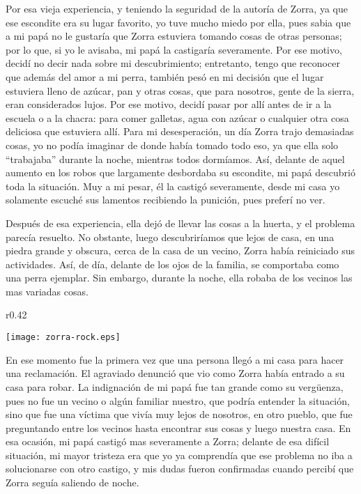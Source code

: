 Por esa vieja experiencia, y teniendo la seguridad de la autoría de Zorra, ya que ese escondite era su lugar favorito, yo tuve mucho miedo por ella, pues sabia que a mi papá no le gustaría que Zorra estuviera tomando cosas de otras personas; por lo que, si yo le avisaba, mi papá la castigaría severamente. Por ese motivo, decidí no decir nada sobre mi descubrimiento; entretanto, tengo que reconocer que además del amor a mi perra, también pesó en mi decisión que el lugar estuviera lleno de azúcar, pan y otras cosas, que para nosotros, gente de la sierra, eran considerados lujos.
Por ese motivo, decidí pasar por allí antes de ir a la escuela o a la chacra: para comer galletas, agua con azúcar o cualquier otra cosa deliciosa que estuviera allí.
Para mi desesperación, un día Zorra trajo demasiadas cosas, yo no podía imaginar de donde había tomado todo eso, ya que ella solo ``trabajaba'' durante la noche, mientras todos dormíamos. Así, delante de aquel aumento en los robos que largamente desbordaba su escondite, mi papá descubrió toda la situación.
Muy a mi pesar, él la castigó severamente, desde mi casa yo solamente escuché sus lamentos recibiendo la punición, pues preferí no ver.


Después de esa experiencia, ella dejó de llevar las cosas a la huerta, y el problema parecía resuelto. No obstante, luego descubriríamos que lejos de casa, en una piedra grande y obscura, cerca de la casa de un vecino, 
Zorra había reiniciado sus actividades. Así, de día, delante de los ojos de la familia, se comportaba como una perra ejemplar. Sin embargo, durante la noche, ella robaba de los vecinos las mas variadas cosas.

\ifdefined\EnableIncludeImages
\begin{wrapfigure}{r}{0.42\textwidth}
  \begin{center}
  \vspace{-10pt}
    \texttt{[image: zorra-rock.eps]}
  \end{center}
  \vspace{-20pt}
\end{wrapfigure}
\fi
En ese momento fue la primera vez que una persona llegó a mi casa para hacer una reclamación. El agraviado denunció que vio como Zorra había entrado a su casa para robar.
La indignación de mi papá fue tan grande como su vergüenza, pues no fue un vecino o algún familiar nuestro, que podría entender la situación, sino que fue una víctima que vivía muy lejos de nosotros, en otro pueblo, que fue preguntando entre los vecinos hasta encontrar sus cosas y luego nuestra casa.
En esa ocasión, mi papá castigó mas severamente a Zorra; delante de esa difícil situación, mi mayor tristeza era que yo ya comprendía que ese problema no iba a solucionarse con otro castigo, y mis dudas fueron confirmadas cuando percibí que Zorra seguía saliendo de noche.

